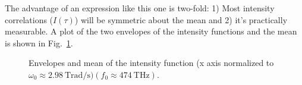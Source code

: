 \begin{homeworkProblem}
    The advantage of an expression like this one is two-fold: 1) Most intensity
    correlations ($ I(\tau) $) will be symmetric about the mean and 2) it's
    practically measurable. A plot of the two envelopes of the intensity
    functions and the mean is shown in Fig.~\ref{fig:Figure1b}.

    \begin{figure}[ht]
        \centering
        
        \caption{Envelopes and mean of the intensity function (x axis normalized to $
            \omega_0 \approx \SI{2.98}{\tera\radian\per\second}) (f_0 \approx
        \SI{474}{\tera\hertz})$.}
        \label{fig:Figure1b}
    \end{figure}
\end{homeworkProblem}
